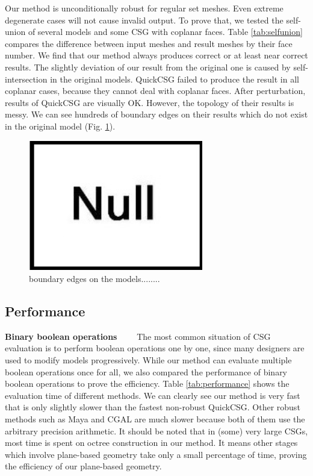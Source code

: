 \documentclass[10pt,journal,compsoc]{IEEEtran}
\begin{document}
Our method is unconditionally robust for regular set meshes. Even extreme degenerate cases will not cause invalid output. To prove that, we tested the self-union of several models and some CSG with coplanar faces. Table \ref{tab:selfunion} compares the difference between input meshes and result meshes by their face number. We find that our method always produces correct or at least near correct results. The slightly deviation of our result from the original one is caused by self-intersection in the original models. QuickCSG failed to produce the result in all coplanar cases, because they cannot deal with coplanar faces. After perturbation, results of QuickCSG are visually OK. However, the topology of their results is messy. We can see hundreds of boundary edges on their results which do not exist in the original model (Fig. \ref{fig:boundaryedge}).

\begin{figure}[t]
\centering
\includegraphics[width=3in]{null}
\caption{boundary edges on the models........}
\label{fig:boundaryedge}
\end{figure}

\subsection{Performance}
\vspace{0.5em}
\noindent\textbf{Binary boolean operations}~~~~
The most common situation of CSG evaluation is to perform boolean operations one by one, since many designers are used to modify models progressively. While our method can evaluate multiple boolean operations once for all, we also compared the performance of binary boolean operations to prove the efficiency. Table \ref{tab:performance} shows the evaluation time of different methods. We can clearly see our method is very fast that is only slightly slower than the fastest non-robust QuickCSG. Other robust methods such as Maya and CGAL are much slower because both of them use the arbitrary precision arithmetic. It should be noted that in (some) very large CSGs, most time is spent on octree construction in our method. It means other stages which involve plane-based geometry take only a small percentage of time, proving the efficiency of our plane-based geometry.
\end{document}
